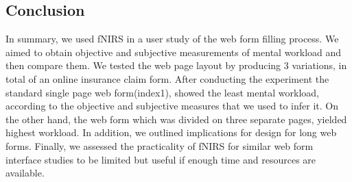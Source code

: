 \documentclass[../main/Replicate.tex]{subfiles}
\begin{document}
%	
	\subsection{Conclusion}
	In summary, we used fNIRS in a user study of the web form filling process. We aimed to obtain objective and subjective measurements of mental workload and then compare them. We tested the web page layout by producing 3 variations, in total of an online insurance claim form. After conducting the experiment the standard single page web form(index1), showed the least mental workload, according to the objective and subjective measures that we used to infer it. On the other hand, the web form which was divided on three separate pages, yielded highest workload. In addition, we outlined implications for design for long web forms. Finally, we assessed the practicality of fNIRS for similar web form interface studies to be limited but useful if enough time and resources are available.
\end{document}
